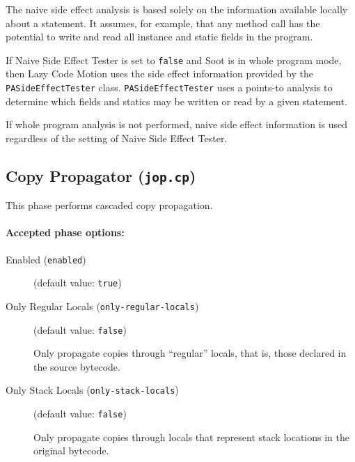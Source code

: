 \documentclass{article}
\begin{document}
\begin{description}
\par

The naive side effect analysis is based solely on the information
available locally about a statement. It assumes, for example,
that any method call has the potential to write and read all
instance and static fields in the program.

\par

If Naive Side Effect Tester is set to {\tt false} and Soot is
in whole program mode, then Lazy Code Motion uses the side effect
information provided by the {\tt PASideEffectTester}
class. {\tt PASideEffectTester} uses a points-to analysis to
determine which fields and statics may be written or read by a
given statement.

\par

If whole program analysis is not performed, naive side effect
information is used regardless of the setting of
Naive Side Effect Tester.




\end{description}

\subsection{Copy Propagator ({\tt jop.cp})}


\par

This phase performs cascaded copy propagation.


\paragraph{Accepted phase options:} 

\begin{description}

\item[Enabled ({\tt enabled})]
(default value: {\tt true})






\item[Only Regular Locals ({\tt only-regular-locals})]
(default value: {\tt false})




Only propagate copies through ``regular'' locals, that is,
those declared in the source bytecode.



\item[Only Stack Locals ({\tt only-stack-locals})]
(default value: {\tt false})




Only propagate copies through locals that represent stack locations in
the original bytecode.



\end{description}
\end{document}
